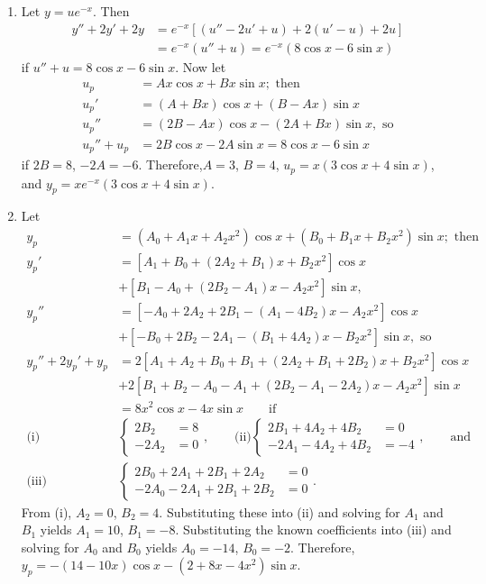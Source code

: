 \documentclass[openany]{book}
\newenvironment{sectionSolutions}{
 \begin{enumerate}[item-label={\thesection.\arabic{enumi}.}]
}{
 \end{enumerate}
}
\begin{document}
\begin{sectionSolutions}
\item
Let $y=ue^{-x}$. Then
\begin{align*}
y''+2y'+2y&=e^{-x}\left[(u''-2u'+u)+2(u'-u)+2u\right]\\
&=e^{-x}(u''+u)= e^{-x}(8\cos x-6\sin x)
\end{align*}
 if $u''+u=8\cos x-6\sin x$.
Now let
\begin{align*}
u_p&=Ax\cos x+Bx\sin x; \text{ then}\\
u_p'&=(A+Bx)\cos x+(B-Ax)\sin x\\
u_p''&=(2B-Ax)\cos x-(2A+Bx)\sin x, \text{ so}\\
u_p''+u_p&=2B\cos x-2A\sin x=8\cos x-6\sin x
\end{align*}
if $2B=8$, $-2A=-6$. Therefore,$A=3$, $B=4$, $u_p=x(3\cos x+4\sin x)$,
and $y_p=xe^{-x}(3\cos x+4\sin x)$.


\item
Let
\begin{align*}
y_p&=(A_0+A_1x+A_2x^2)\cos x +(B_0+B_1x+B_2x^2)\sin x;\text{ then}\\
y_p'&=\left[A_1+B_0+(2A_2+B_1)x+B_2x^2\right]\cos x\\
&+\left[B_1-A_0+(2B_2-A_1)x-A_2x^2\right]\sin x, \\
y_p''&=\left[-A_0+2A_2+2B_1-(A_1-4B_2)x-A_2x^2\right]\cos x\\
&+\left[-B_0+2B_2-2A_1-(B_1+4A_2)x-B_2x^2\right]\sin x,\text{ so}\\
y_p''+2y_p'+y_p&=2\left[A_1+A_2+B_0+B_1+(2A_2+B_1+2B_2)x+
B_2x^2\right]\cos x\\
& +2\left[B_1+B_2-A_0-A_1+(2B_2-A_1-2A_2)x-A_2x^2\right]\sin x\\
&=8x^2\cos x-4x\sin x \qquad\text{if}\\
\text{(i) }& \begin{cases} 2B_2&=8\\-2A_2&=0\end{cases},\qquad
\text{(ii)} \begin{cases} 2B_1+4A_2+4B_2&=0\\-2A_1-4A_2+4B_2&=-4\end{cases},\qquad\text{and}
\\
\text{(iii)}& \begin{cases}2B_0+2A_1+2B_1+2A_2&=0
\\-2A_0-2A_1+2B_1+2B_2&=0\end{cases}.
\end{align*}
From (i), $A_2=0$, $B_2=4$. Substituting these into (ii) and solving
for $A_1$ and $B_1$ yields $A_1=10$, $B_1=-8$. Substituting the known
coefficients into (iii) and solving for $A_0$ and $B_0$ yields
$A_0=-14$, $B_0=-2$. Therefore,$y_p=-(14-10x)\cos x-(2+8x-4x^2)\sin
x$.



\end{sectionSolutions}
\end{document}
